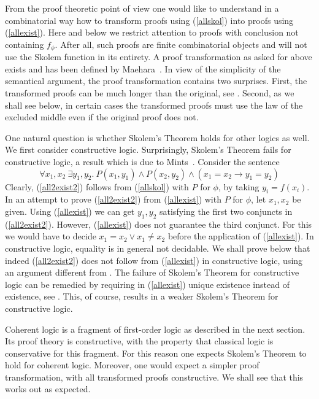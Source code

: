 \documentclass[10pt,a4paper]{article}
\begin{document}
From the proof theoretic point of view one would like to understand
in a combinatorial way how to transform proofs using (\ref{allskol}) into proofs
using  (\ref{allexist}).  Here and below we restrict attention to
proofs with conclusion not containing $f_\phi$. After all, such proofs are finite
combinatorial objects and will not use the Skolem function in its entirety.
A proof transformation as asked for above
exists and has been defined by Maehara~\cite{Maehara}. 
In view of the simplicity of the semantical argument, the proof transformation
contains two surprises.
First, the transformed proofs can be much longer than the original, see \cite{xxx}.
Second, as we shall see below, in certain cases the transformed proofs must use
the law of the excluded middle even if the original proof does not.

One natural question is whether Skolem's Theorem holds for other logics as well.
We first consider constructive logic. Surprisingly, Skolem's Theorem fails
for constructive logic, a result which is due to Mints~\cite{Mints}.
Consider the sentence
\begin{equation}\label{all2exist2}
\forall x_1,x_2~\exists y_1,y_2. ~P(x_1,y_1) \land P(x_2,y_2) \land (x_1 = x_2 \to y_1 = y_2)
\end{equation}
Clearly,  (\ref{all2exist2}) follows from (\ref{allskol}) 
with $P$ for $\phi$, by taking $y_i = f(x_i)$.
In an attempt to prove (\ref{all2exist2}) from (\ref{allexist}) 
with $P$ for $\phi$, let $x_1,x_2$ be given.
Using (\ref{allexist}) we can get $y_1,y_2$ satisfying the first two conjuncts
in (\ref{all2exist2}). However, (\ref{allexist}) does not guarantee the third conjunct.
For this we would have to decide $ x_1 = x_2 \lor x_1 \neq x_2$ before the
application of (\ref{allexist}). In constructive logic, equality is in general not decidable.
We shall prove below that indeed (\ref{all2exist2}) does not follow from  (\ref{allexist})
in constructive logic, using an argument different from \cite{Mints}.
The failure of Skolem's Theorem for constructive logic can be remedied by 
requiring in (\ref{allexist}) unique existence instead of existence, see \cite{xxx}.
This, of course, results in a weaker Skolem's Theorem for constructive logic.

Coherent logic is a fragment of first-order logic as described in the next section.
Its proof theory is constructive, with the property that classical logic is conservative
for this fragment. For this reason one expects Skolem's Theorem to hold
for coherent logic. Moreover, one would expect a simpler proof transformation,
with all transformed proofs constructive. We shall see that this works out
as expected.
\end{document}
